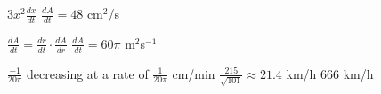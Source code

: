 \begin{Answer}[ref={exRelatedRates}]
	\Question %
	$3 x^{2} \frac{d x}{d t}$
\Question %
$\frac{d A}{d t} =48$ cm$^2$/s 
\Question 
\begin{tasks}
	\task  %
	$ \frac{dA}{dt} =\frac{dr}{dt}\cdot \frac{dA}{dr}$
	\task  %
	$\frac{d A}{d t} =60 \pi$ m$^2$s$^{-1}$
\end{tasks}

\Question %
$\frac{-1}{20 \pi }$ decreasing at a rate of $\frac{1}{20 \pi }$ cm/min 
\Question %
$\frac{215}{\sqrt{101}} \approx 21.4$ km/h 
\Question %
$666$ km/h	
\end{Answer}%


